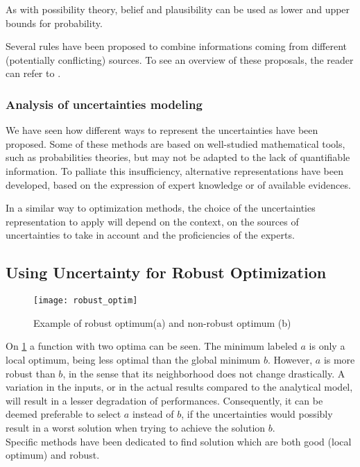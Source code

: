 As with possibility theory, belief and plausibility can be used as lower and upper bounds for probability.

Several rules have been proposed to combine informations coming from different (potentially conflicting) sources. To see an overview of these proposals, the reader can refer to \cite{sentz2002combination}.

\subsubsection{Analysis of uncertainties modeling}

We have seen how different ways to represent the uncertainties have been proposed. Some of these methods are based on well-studied mathematical tools, such as probabilities theories, but may not be adapted to the lack of quantifiable information. To palliate this insufficiency, alternative representations have been developed, based on the expression of expert knowledge or of available evidences.

In a similar way to optimization methods, the choice of the uncertainties representation to apply will depend on the context, on the sources of uncertainties to take in account and the proficiencies of the experts.

\subsection{Using Uncertainty for Robust Optimization}

\begin{figure}
\centering
\texttt{[image: robust\_optim]}
\caption{Example of robust optimum(a) and non-robust optimum (b)}\label{robust_optim_illu}
\end{figure}

On \figurename{} \ref{robust_optim_illu} a function with two optima can be seen. The minimum labeled $a$ is only a local optimum, being less optimal than the global minimum $b$. However, $a$ is more robust than $b$, in the sense that its neighborhood does not change drastically. A variation in the inputs, or in the actual results compared to the analytical model, will result in a lesser degradation of performances. Consequently, it can be deemed preferable to select $a$ instead of $b$, if the uncertainties would possibly result in a worst solution when trying to achieve the solution $b$.\\
Specific methods have been dedicated to find solution which are both good (local optimum) and robust.

